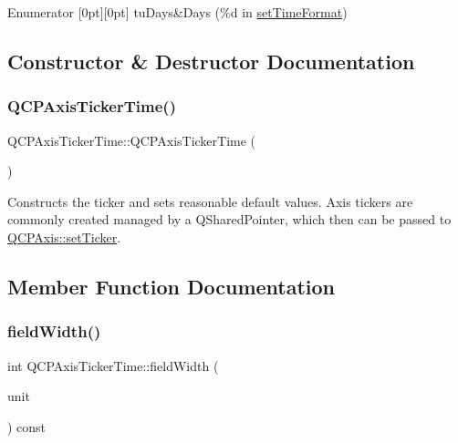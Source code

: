 \begin{DoxyEnumFields}{Enumerator}
[0pt][0pt]{}\mbox{\label{class_q_c_p_axis_ticker_time_a5c48ded8c6d3a1aca9b68219469fea3eaf9729e64545307a80a0e3527d6da6556}} 
tu\+Days&Days (\%d in \mbox{\hyperlink{class_q_c_p_axis_ticker_time_a2f30b6e5125bce4256be9ce3177088ea}{set\+Time\+Format}}) \\
\hline

\end{DoxyEnumFields}


\subsection{Constructor \& Destructor Documentation}
\mbox{\label{class_q_c_p_axis_ticker_time_a5145aac1d2117fdac411d9e8552cc41b}} 
\subsubsection{\texorpdfstring{QCPAxisTickerTime()}{QCPAxisTickerTime()}}
{\footnotesize\ttfamily Q\+C\+P\+Axis\+Ticker\+Time\+::\+Q\+C\+P\+Axis\+Ticker\+Time (\begin{DoxyParamCaption}{ }\end{DoxyParamCaption})}

Constructs the ticker and sets reasonable default values. Axis tickers are commonly created managed by a Q\+Shared\+Pointer, which then can be passed to \mbox{\hyperlink{class_q_c_p_axis_a4ee03fcd2c74d05cd1a419b9af5cfbdc}{Q\+C\+P\+Axis\+::set\+Ticker}}. 

\subsection{Member Function Documentation}
\mbox{\label{class_q_c_p_axis_ticker_time_a6b58a98e4d64c6764aa61a707e4a344d}} 
\subsubsection{\texorpdfstring{fieldWidth()}{fieldWidth()}}
{\footnotesize\ttfamily int Q\+C\+P\+Axis\+Ticker\+Time\+::field\+Width (\begin{DoxyParamCaption}\item[{\mbox{\hyperlink{class_q_c_p_axis_ticker_time_a5c48ded8c6d3a1aca9b68219469fea3e}{Time\+Unit}}}]{unit }\end{DoxyParamCaption}) const\hspace{0.3cm}{\ttfamily [inline]}}

